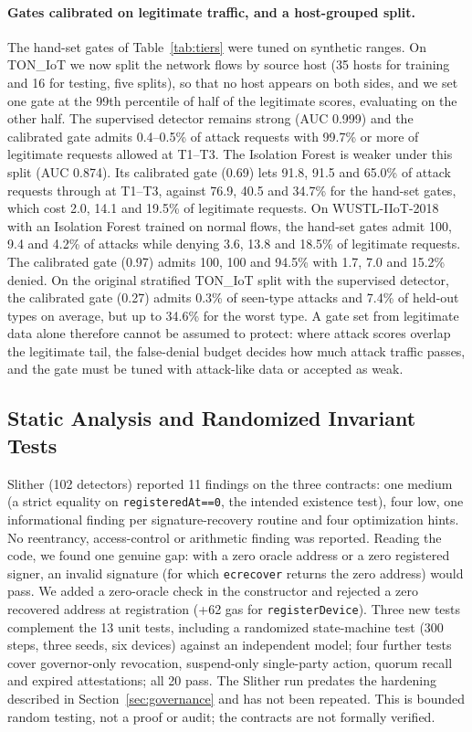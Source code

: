 \paragraph{Gates calibrated on legitimate traffic, and a host-grouped split.} The hand-set gates of Table~\ref{tab:tiers} were tuned on synthetic ranges. On TON\_IoT we now split the network flows by source host (35 hosts for training and 16 for testing, five splits), so that no host appears on both sides, and we set one gate at the 99th percentile of half of the legitimate scores, evaluating on the other half. The supervised detector remains strong (AUC 0.999) and the calibrated gate admits 0.4--0.5\% of attack requests with 99.7\% or more of legitimate requests allowed at T1--T3. The Isolation Forest is weaker under this split (AUC 0.874). Its calibrated gate (0.69) lets 91.8, 91.5 and 65.0\% of attack requests through at T1--T3, against 76.9, 40.5 and 34.7\% for the hand-set gates, which cost 2.0, 14.1 and 19.5\% of legitimate requests. On WUSTL-IIoT-2018 with an Isolation Forest trained on normal flows, the hand-set gates admit 100, 9.4 and 4.2\% of attacks while denying 3.6, 13.8 and 18.5\% of legitimate requests. The calibrated gate (0.97) admits 100, 100 and 94.5\% with 1.7, 7.0 and 15.2\% denied. On the original stratified TON\_IoT split with the supervised detector, the calibrated gate (0.27) admits 0.3\% of seen-type attacks and 7.4\% of held-out types on average, but up to 34.6\% for the worst type. A gate set from legitimate data alone therefore cannot be assumed to protect: where attack scores overlap the legitimate tail, the false-denial budget decides how much attack traffic passes, and the gate must be tuned with attack-like data or accepted as weak.

\subsection{Static Analysis and Randomized Invariant Tests}\label{sec:assure}
Slither (102 detectors) reported 11 findings on the three contracts: one medium (a strict equality on \texttt{registeredAt==0}, the intended existence test), four low, one informational finding per signature-recovery routine and four optimization hints. No reentrancy, access-control or arithmetic finding was reported. Reading the code, we found one genuine gap: with a zero oracle address or a zero registered signer, an invalid signature (for which \texttt{ecrecover} returns the zero address) would pass. We added a zero-oracle check in the constructor and rejected a zero recovered address at registration (+62 gas for \texttt{registerDevice}). Three new tests complement the 13 unit tests, including a randomized state-machine test (300 steps, three seeds, six devices) against an independent model; four further tests cover governor-only revocation, suspend-only single-party action, quorum recall and expired attestations; all 20 pass. The Slither run predates the hardening described in Section~\ref{sec:governance} and has not been repeated. This is bounded random testing, not a proof or audit; the contracts are not formally verified.

